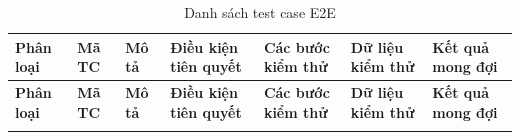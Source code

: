 {
\renewcommand{\arraystretch}{1.05}
\setlength{\tabcolsep}{3pt}
\footnotesize
\begin{landscape}
\pagestyle{plain}
\begin{longtable}{|>{\raggedright\arraybackslash}p{1.2cm}|>{\raggedright\arraybackslash}p{1.0cm}|>{\raggedright\arraybackslash}p{2.8cm}|>{\raggedright\arraybackslash}p{2.5cm}|>{\raggedright\arraybackslash}p{4.5cm}|>{\raggedright\arraybackslash}p{2.5cm}|>{\raggedright\arraybackslash}p{4.5cm}|}
\caption{Danh sách test case E2E}
\label{tab:e2e-all} \\
\hline
\textbf{Phân loại} & \textbf{Mã TC} & \textbf{Mô tả} & \textbf{Điều kiện tiên quyết} & \textbf{Các bước kiểm thử} & \textbf{Dữ liệu kiểm thử} & \textbf{Kết quả mong đợi} \\
\hline
\endfirsthead

\hline
\textbf{Phân loại} & \textbf{Mã TC} & \textbf{Mô tả} & \textbf{Điều kiện tiên quyết} & \textbf{Các bước kiểm thử} & \textbf{Dữ liệu kiểm thử} & \textbf{Kết quả mong đợi} \\
\hline
\endhead

\hline
\endfoot


\end{longtable}
\end{landscape}}
